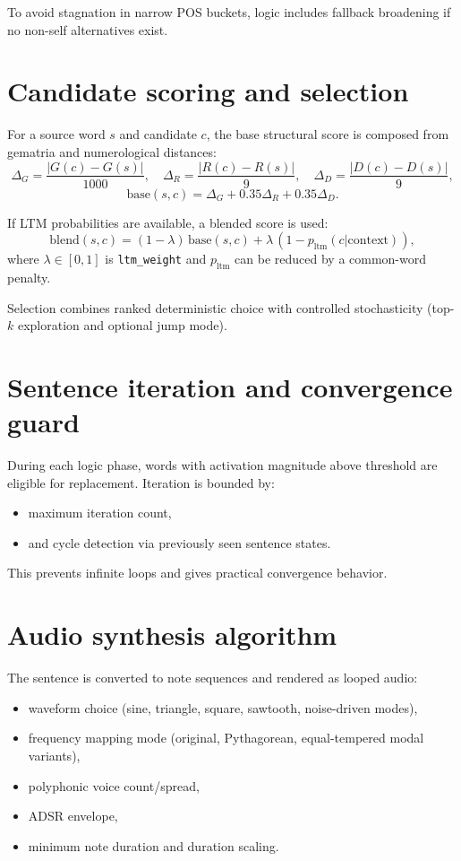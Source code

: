 \documentclass[11pt,a4paper]{report}
\begin{document}
To avoid stagnation in narrow POS buckets, logic includes fallback broadening if no non-self alternatives exist.

\section{Candidate scoring and selection}
For a source word $s$ and candidate $c$, the base structural score is composed from gematria and numerological distances:
\[
\Delta_G = \frac{|G(c)-G(s)|}{1000},\quad
\Delta_R = \frac{|R(c)-R(s)|}{9},\quad
\Delta_D = \frac{|D(c)-D(s)|}{9},
\]
\[
\text{base}(s,c)=\Delta_G+0.35\Delta_R+0.35\Delta_D.
\]

If LTM probabilities are available, a blended score is used:
\[
\text{blend}(s,c)=(1-\lambda)\,\text{base}(s,c)+\lambda\,(1-p_{\text{ltm}}(c|\text{context})),
\]
where $\lambda \in [0,1]$ is \texttt{ltm\_weight} and $p_{\text{ltm}}$ can be reduced by a common-word penalty.

Selection combines ranked deterministic choice with controlled stochasticity (top-$k$ exploration and optional jump mode).

\section{Sentence iteration and convergence guard}
During each logic phase, words with activation magnitude above threshold are eligible for replacement. Iteration is bounded by:
\begin{itemize}
  \item maximum iteration count,
  \item and cycle detection via previously seen sentence states.
\end{itemize}
This prevents infinite loops and gives practical convergence behavior.

\section{Audio synthesis algorithm}
The sentence is converted to note sequences and rendered as looped audio:
\begin{itemize}
  \item waveform choice (sine, triangle, square, sawtooth, noise-driven modes),
  \item frequency mapping mode (original, Pythagorean, equal-tempered modal variants),
  \item polyphonic voice count/spread,
  \item ADSR envelope,
  \item minimum note duration and duration scaling.
\end{itemize}
\end{document}
